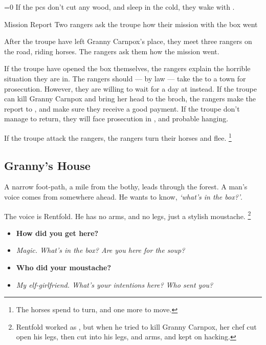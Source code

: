 \documentclass[10pt,twoside]{book}
\begin{document}
\ifnum\value{temperature}=0
  If the \glspl{pc} don't cut any wood, and sleep in the cold, they wake with .
\fi

{Mission Report}%
{Two \glspl{ranger} ask the troupe how their mission with the box went}%

After the troupe have left Granny Carnpox's place, they meet three \glspl{ranger} on the road, riding horses.
The rangers ask them how the mission went.

\humansoldier[\npc{\T[3]\Hu\M\F}{\composeHumanName, \composeHumanName, \& \composeHumanName}]


If the troupe have opened the box themselves, the \glspl{ranger} explain the horrible situation they are in.
The \glspl{ranger} should --- by law --- take the to a town for prosecution.
However, they are willing to wait for a day at  instead.
If the troupe can kill Granny Carnpox and bring her head to the \gls{broch}, the \glspl{ranger} make the report to , and make sure they receive a good payment.
If the troupe don't manage to return, they will face prosecution in , and probable hanging.

If the troupe attack the \glspl{ranger}, the \glspl{ranger} turn their horses and flee.%
\footnote{The horses spend  to turn, and one more to move.}

\subsection{Granny's House}

\begin{boxtext}
  A narrow foot-path, a mile from the \gls{bothy}, leads through the forest.
  A man's voice comes from somewhere ahead.
  He wants to know, \textit{`what's in the box?'}.
\end{boxtext}

The voice is Rentfold.
He has no arms, and no legs, just a stylish moustache.%
\footnote{Rentfold worked as , but when he tried to kill Granny Carnpox, her chef cut open his legs, then cut into his legs, and arms, and kept on hacking.}

\begin{itemize}
  \item\bf
  How did you get here?
  \item\it
  Magic.
  What's in the box?
  Are you here for the soup?
  \item\bf
  Who did your moustache?
  \item\it
  My elf-girlfriend.
  What's your intentions here?
  Who sent you?
\end{itemize}
\end{document}
